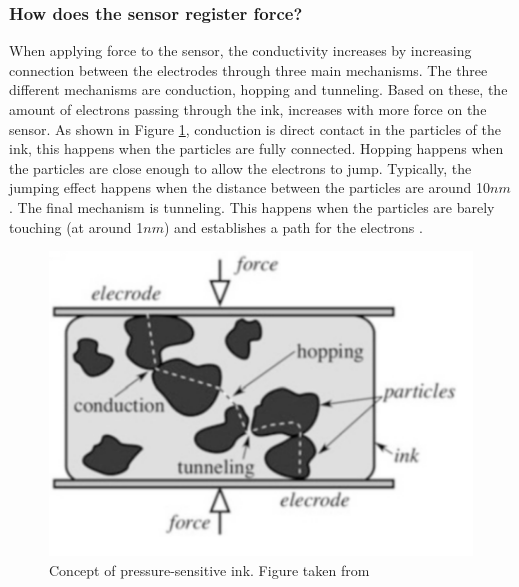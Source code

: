 \subsubsection{How does the sensor register force?}
When applying force to the sensor, the conductivity increases by increasing connection between the electrodes through three main mechanisms.
The three different mechanisms are conduction, hopping and tunneling.
Based on these, the amount of electrons passing through the ink, increases with more force on the sensor. As shown in Figure \ref{fig:sensorconcept}, conduction is direct contact in the particles of the ink, this happens when the particles are fully connected. Hopping happens when the particles are close enough to allow the electrons to jump. Typically, the jumping effect happens when the distance between the particles are around 10$nm$. The final mechanism is tunneling. This happens when the particles are barely touching (at around 1$nm$) and establishes a path for the electrons \citep[10.3, p.418]{handbook}.

\begin{figure}[!b]
    \centering
    \includegraphics[scale=0.75]{figures/sensorconcept.png}
    \caption{Concept of pressure-sensitive ink. Figure taken from \cite[p.418]{handbook}}
    \label{fig:sensorconcept}
\end{figure}

